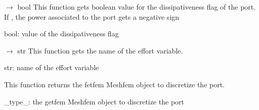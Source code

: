 \documentclass[letterpaper,10pt,english]{sphinxmanual}
\begin{document}
\begin{fulllineitems}
\begin{fulllineitems}
\end{fulllineitems}


\begin{fulllineitems}
\label{\detokenize{scrimp:scrimp.port.Port.get_dissipative}}
\pysigstartsignatures
\pysiglinewithargsret
{}
{}
{{ $\rightarrow$ bool}}
\pysigstopsignatures
\sphinxAtStartPar
This function gets boolean value for the dissipativeness flag of the port.
If , the power associated to the port gets a negative sign
\begin{description}
\sphinxAtStartPar
bool: value of the dissipativeness flag

\end{description}

\end{fulllineitems}


\begin{fulllineitems}
\label{\detokenize{scrimp:scrimp.port.Port.get_effort}}
\pysigstartsignatures
\pysiglinewithargsret
{}
{}
{{ $\rightarrow$ str}}
\pysigstopsignatures
\sphinxAtStartPar
This function gets the name of the effort variable.
\begin{description}
\sphinxAtStartPar
str: name of the effort variable

\end{description}

\end{fulllineitems}


\begin{fulllineitems}
\label{\detokenize{scrimp:scrimp.port.Port.get_fem}}
\pysigstartsignatures
\pysiglinewithargsret
{}
{}
{}
\pysigstopsignatures
\sphinxAtStartPar
This function returns the fetfem Meshfem object to discretize the port.
\begin{description}
\sphinxAtStartPar
\_type\_: the getfem Meshfem object to discretize the port


\end{description}
\end{fulllineitems}
\end{fulllineitems}
\end{document}
